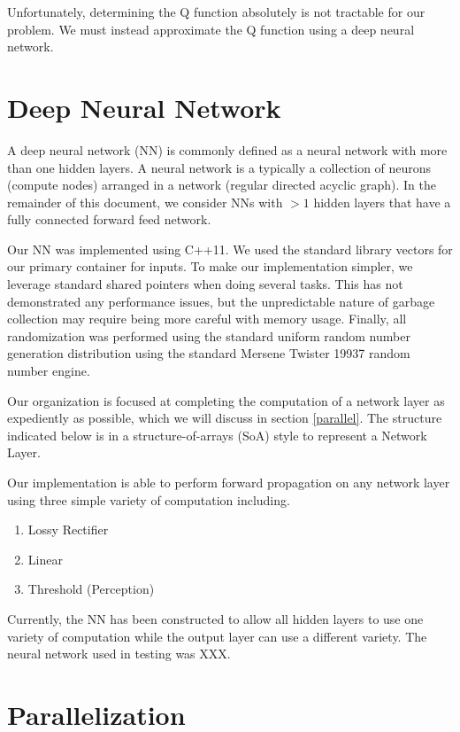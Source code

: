 Unfortunately, determining the Q function absolutely is not tractable for our problem.
We must instead approximate the Q function using a deep neural network.

\section*{Deep Neural Network}
A deep neural network (NN) is commonly defined as a neural network with more than one hidden layers.
A neural network is a typically a collection of neurons (compute nodes) arranged in a network (regular directed acyclic graph).
In the remainder of this document, we consider NNs with $>1$ hidden layers that have a fully connected forward feed network.

Our NN was implemented using C++11.
We used the standard library vectors for our primary container for inputs.
To make our implementation simpler, we leverage standard shared pointers when doing several tasks.
This has not demonstrated any performance issues, but the unpredictable nature of garbage collection may require being more careful with memory usage.
Finally, all randomization was performed using the standard uniform random number generation distribution using the standard Mersene Twister 19937 random number engine.

Our organization is focused at completing the computation of a network layer as expediently as possible, which we will discuss in section \ref{parallel}.
The structure indicated below is in a structure-of-arrays (SoA) style to represent a Network Layer.


Our implementation is able to perform forward propagation on any network layer using three simple variety of computation including.
\begin{enumerate}
\item Lossy Rectifier
\item Linear
\item Threshold (Perception)
\end{enumerate}
Currently, the NN has been constructed to allow all hidden layers to use one variety of computation while the output layer can use a different variety.
The neural network used in testing was XXX.


\section*{Parallelization}

